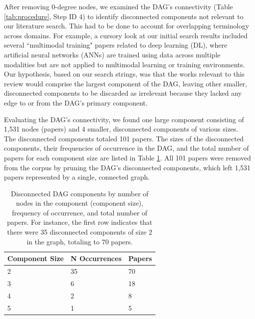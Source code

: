 \documentclass[manuscript,screen,review]{acmart}
\begin{document}
After removing 0-degree nodes, we examined the DAG's connectivity (Table \ref{tab:procedure}, Step ID 4) to identify disconnected components not relevant to our literature search. This had to be done to account for overlapping terminology across domains. For example, a cursory look at our initial search results included several ``multimodal training" papers related to deep learning (DL), where artificial neural networks (ANNs) are trained using data across multiple modalities but are not applied to multimodal learning or training environments. Our hypothesis, based on our search strings, was that the works relevant to this review would comprise the largest component of the DAG, leaving other smaller, disconnected components to be discarded as irrelevant because they lacked any edge to or from the DAG's primary component.

Evaluating the DAG's connectivity, we found one large component consisting of 1,531 nodes (papers) and 4 smaller, disconnected components of various sizes. The disconnected components totaled 101 papers. The sizes of the disconnected components, their frequencies of occurrence in the DAG, and the total number of papers for each component size are listed in Table \ref{tab:disconnected}. All 101 papers were removed from the corpus by pruning the DAG's disconnected components, which left 1,531 papers represented by a single, connected graph. 

\begin{table}[htbp]
    \renewcommand{\arraystretch}{1.3}%
    \centering
    \caption{Disconnected DAG components by number of nodes in the component (component size), frequency of occurrence, and total number of papers. For instance, the first row indicates that there were 35 disconnected components of size 2 in the graph, totaling to 70 papers.}
    \begin{tabularx}{0.5\linewidth}{l@{\hskip .25in} l@{\hskip .25in} l@{\hskip .25in}}
        Component Size & N Occurrences & Papers \\
        \midrule
        
        2    &  35 &  70\\
        \midrule
        
        3    &  6  &  18\\
        \midrule
        
        4    &  2  &  8\\
        \midrule
        
        5    &  1  &  5\\

        \bottomrule
    \end{tabularx}
    \label{tab:disconnected}
\end{table}
\end{document}
